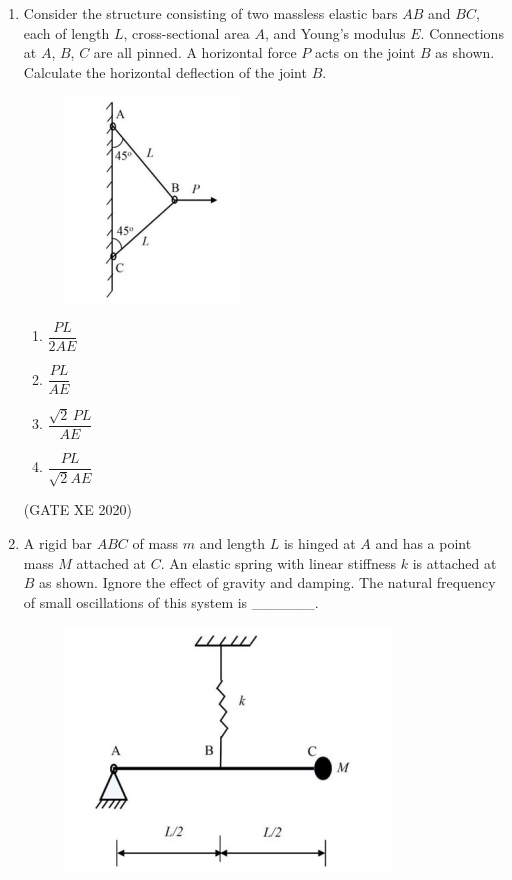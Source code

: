 \documentclass[12pt]{article}
\begin{document}
\begin{enumerate}
\item Consider the structure consisting of two massless elastic bars $AB$ and $BC$, each of length $L$, cross-sectional area $A$, and Young’s modulus $E$. Connections at $A$, $B$, $C$ are all pinned. A horizontal force $P$ acts on the joint $B$ as shown. Calculate the horizontal deflection of the joint $B$.

\begin{figure}[H]
    \centering
    \includegraphics[width=0.5\columnwidth]{figs/ass4_d_q12.png}
    \caption{}
    \label{fig:placeholder}
\end{figure}

\begin{enumerate}
\item $\dfrac{PL}{2AE}$
\item $\dfrac{PL}{AE}$
\item $\dfrac{\sqrt{2}\,PL}{AE}$
\item $\dfrac{PL}{\sqrt{2}AE}$
\end{enumerate}
(GATE XE 2020)

\item A rigid bar $ABC$ of mass $m$ and length $L$ is hinged at $A$ and has a point mass $M$ attached at $C$. An elastic spring with linear stiffness $k$ is attached at $B$ as shown. Ignore the effect of gravity and damping. The natural frequency of small oscillations of this system is \_\_\_\_\_\_.

\begin{figure}[H]
    \centering
    \includegraphics[width=0.5\columnwidth]{figs/ass4_d_q13.png}
    \caption{}
    \label{fig:placeholder}
\end{figure}


\end{enumerate}
\end{document}
